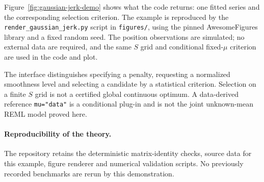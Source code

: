 Figure~\ref{fig:gaussian-jerk-demo} shows what the code returns:
one fitted series and the corresponding selection criterion.
The example is reproduced by the
\texttt{render\_gaussian\_jerk.py} script in
\texttt{figures/}, using the pinned AwesomeFigures
library and a fixed random seed.
The position observations are simulated; no external data
are required, and the same $S$ grid and conditional
fixed-$\mu$ criterion are used in the code and plot.

The interface distinguishes specifying a penalty, requesting a
normalized smoothness level and selecting a candidate by a
statistical criterion. Selection on a finite $S$ grid is
not a certified global continuous optimum. A data-derived
reference \texttt{mu="data"} is a conditional plug-in
and is not the joint unknown-mean REML model proved here.

\paragraph{Reproducibility of the theory.}
The repository retains the deterministic matrix-identity
checks, source data for this example, figure renderer
and numerical validation scripts. No previously recorded
benchmarks are rerun by this demonstration.
